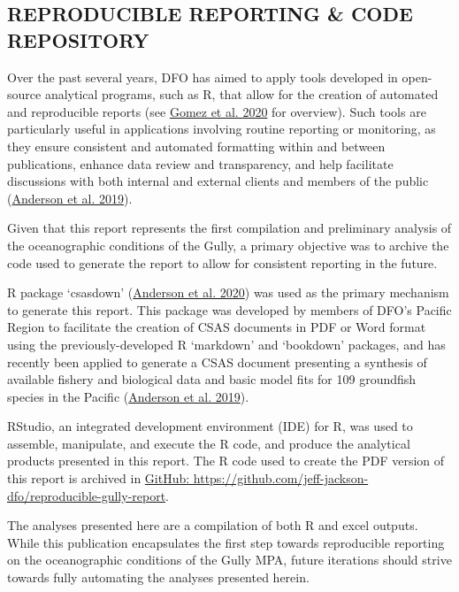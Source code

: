 \documentclass[12pt]{article}\usepackage[]{graphicx}\usepackage[]{color}
\begin{document}
\hypertarget{reproducible-reporting-code-repository}{%
\subsection{\texorpdfstring{\textbf{REPRODUCIBLE REPORTING \& CODE REPOSITORY}}{REPRODUCIBLE REPORTING \& CODE REPOSITORY}}\label{reproducible-reporting-code-repository}}

Over the past several years, DFO has aimed to apply tools developed in open-source analytical programs, such as R, that allow for the creation of automated and reproducible reports (see \protect\hyperlink{ref-gomez_2020}{Gomez et al. 2020} for overview). Such tools are particularly useful in applications involving routine reporting or monitoring, as they ensure consistent and automated formatting within and between publications, enhance data review and transparency, and help facilitate discussions with both internal and external clients and members of the public (\protect\hyperlink{ref-anderson_2019}{Anderson et al. 2019}).

Given that this report represents the first compilation and preliminary analysis of the oceanographic conditions of the Gully, a primary objective was to archive the code used to generate the report to allow for consistent reporting in the future.

R package `csasdown' (\protect\hyperlink{ref-anderson_2020}{Anderson et al. 2020}) was used as the primary mechanism to generate this report. This package was developed by members of DFO's Pacific Region to facilitate the creation of CSAS documents in PDF or Word format using the previously-developed R `markdown' and `bookdown' packages, and has recently been applied to generate a CSAS document presenting a synthesis of available fishery and biological data and basic model fits for 109 groundfish species in the Pacific (\protect\hyperlink{ref-anderson_2019}{Anderson et al. 2019}).

RStudio, an integrated development environment (IDE) for R, was used to assemble, manipulate, and execute the R code, and produce the analytical products presented in this report. The R code used to create the PDF version of this report is archived in \href{https://github.com/jeff-jackson-dfo/reproducible-gully-report}{GitHub: https://github.com/jeff-jackson-dfo/reproducible-gully-report}.

The analyses presented here are a compilation of both R and excel outputs. While this publication encapsulates the first step towards reproducible reporting on the oceanographic conditions of the Gully MPA, future iterations should strive towards fully automating the analyses presented herein.
\end{document}
